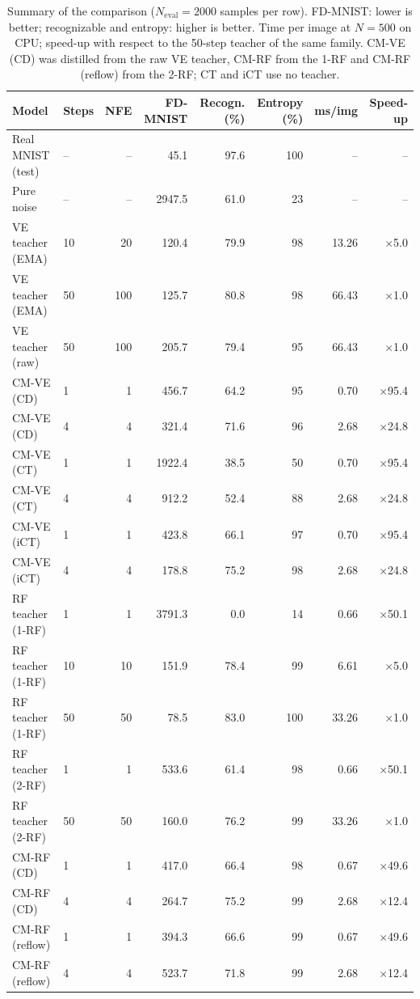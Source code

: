 \documentclass{article}
\begin{document}
\begin{table}[!htbp]
  \caption{Summary of the comparison ($N_\text{eval} = 2000$ samples per row).
  FD-MNIST: lower is better; recognizable and entropy: higher is better.
  Time per image at $N = 500$ on CPU; speed-up with respect to the 50-step
  teacher of the same family. CM-VE (CD) was distilled from the raw VE
  teacher, CM-RF from the 1-RF and CM-RF (reflow) from the 2-RF; CT and iCT
  use no teacher.}
  \label{tab:summary}
  \centering
  \footnotesize
  \begin{tabular}{llrrrrrr}
    \toprule
    Model & Steps & NFE & FD-MNIST & Recogn. (\%) & Entropy (\%) & ms/img & Speed-up \\
    \midrule
    Real MNIST (test) & -- & -- & 45.1 & 97.6 & 100 & -- & -- \\
    Pure noise & -- & -- & 2947.5 & 61.0 & 23 & -- & -- \\
    \midrule
    VE teacher (EMA) & 10 & 20 & 120.4 & 79.9 & 98 & 13.26 & $\times$5.0 \\
    VE teacher (EMA) & 50 & 100 & 125.7 & 80.8 & 98 & 66.43 & $\times$1.0 \\
    VE teacher (raw) & 50 & 100 & 205.7 & 79.4 & 95 & 66.43 & $\times$1.0 \\
    \midrule
    CM-VE (CD) & 1 & 1 & 456.7 & 64.2 & 95 & 0.70 & $\times$95.4 \\
    CM-VE (CD) & 4 & 4 & 321.4 & 71.6 & 96 & 2.68 & $\times$24.8 \\
    \midrule
    CM-VE (CT) & 1 & 1 & 1922.4 & 38.5 & 50 & 0.70 & $\times$95.4 \\
    CM-VE (CT) & 4 & 4 & 912.2 & 52.4 & 88 & 2.68 & $\times$24.8 \\
    CM-VE (iCT) & 1 & 1 & 423.8 & 66.1 & 97 & 0.70 & $\times$95.4 \\
    CM-VE (iCT) & 4 & 4 & 178.8 & 75.2 & 98 & 2.68 & $\times$24.8 \\
    \midrule
    RF teacher (1-RF) & 1 & 1 & 3791.3 & 0.0 & 14 & 0.66 & $\times$50.1 \\
    RF teacher (1-RF) & 10 & 10 & 151.9 & 78.4 & 99 & 6.61 & $\times$5.0 \\
    RF teacher (1-RF) & 50 & 50 & 78.5 & 83.0 & 100 & 33.26 & $\times$1.0 \\
    RF teacher (2-RF) & 1 & 1 & 533.6 & 61.4 & 98 & 0.66 & $\times$50.1 \\
    RF teacher (2-RF) & 50 & 50 & 160.0 & 76.2 & 99 & 33.26 & $\times$1.0 \\
    \midrule
    CM-RF (CD) & 1 & 1 & 417.0 & 66.4 & 98 & 0.67 & $\times$49.6 \\
    CM-RF (CD) & 4 & 4 & 264.7 & 75.2 & 99 & 2.68 & $\times$12.4 \\
    \midrule
    CM-RF (reflow) & 1 & 1 & 394.3 & 66.6 & 99 & 0.67 & $\times$49.6 \\
    CM-RF (reflow) & 4 & 4 & 523.7 & 71.8 & 99 & 2.68 & $\times$12.4 \\
    \bottomrule
  \end{tabular}
\end{table}
\end{document}
